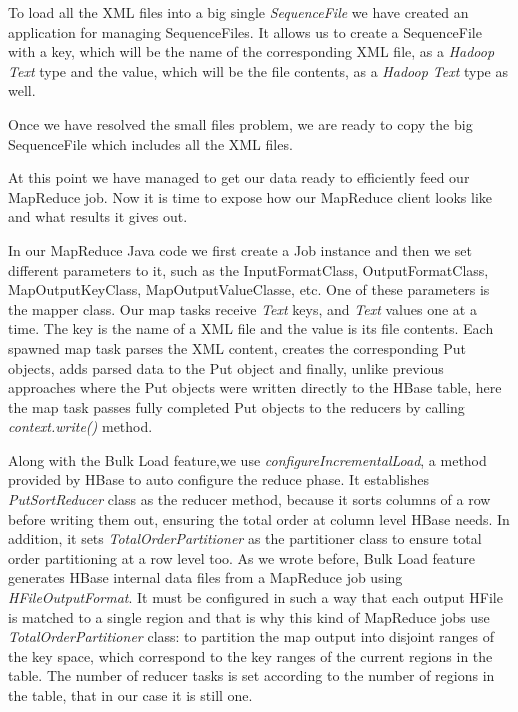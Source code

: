 To load all the XML files into a big single \textit{SequenceFile} we have created an application for managing SequenceFiles. It allows us to create a SequenceFile with a key, which will be the name of the corresponding XML file, as a \textit{Hadoop Text} type and the value, which will be the file contents, as a \textit{Hadoop Text} type as well.

\bigskip

Once we have resolved the small files problem, we are ready to copy the big SequenceFile which includes all the XML files.
\par
At this point we have managed to get our data ready to efficiently feed our MapReduce job. Now  it is time to expose how our MapReduce client looks like and what results it gives out.

\bigskip



In our MapReduce Java code we first create a Job instance and then we set different parameters to it, such as the InputFormatClass, OutputFormatClass, MapOutputKeyClass, MapOutputValueClasse, etc. One of these parameters is the mapper class. Our map tasks receive \textit{Text} keys, and \textit{Text} values one at a time. The key is the name of a XML file and the value is its file contents. Each spawned map task parses the XML content, creates the corresponding Put objects, adds parsed data to the Put object and finally, unlike previous approaches where the Put objects were written directly to the HBase table, here the map task passes fully completed Put objects to the reducers by calling \textit{context.write()} method.
\par
Along with the Bulk Load feature,we use \textit{configureIncrementalLoad}, a method provided by HBase to auto configure the reduce phase. It establishes \textit{PutSortReducer} class as the reducer method, because it sorts columns of a row before writing them out, ensuring the total order at column level HBase needs. In addition, it sets \textit{TotalOrderPartitioner} as the partitioner class to ensure total order partitioning at a row level too. As we wrote before, Bulk Load feature generates HBase internal data files from a MapReduce job using \textit{HFileOutputFormat}. It must be configured in such a way that each output HFile is matched to a single region and that is why this kind of MapReduce jobs use \textit{TotalOrderPartitioner} class: to partition the map output into disjoint ranges of the key space, which correspond to the key ranges of the current regions in the table. The number of reducer tasks is set according to the number of regions in the table, that in our case it is still one.

